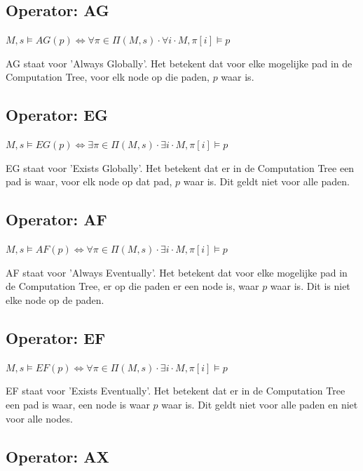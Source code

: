 \documentclass{article}
\begin{document}
		\subsection{Operator: AG}
				
		\( M, s \models AG(p) \iff \forall \pi \in \Pi (M, s) \cdot \forall i \cdot M, \pi [i] \models p\)

		AG staat voor 'Always Globally'. Het betekent dat voor elke mogelijke pad in de Computation Tree, voor elk node op die paden, \( p \) waar is.
		
		\subsection{Operator: EG}
				
		\( M, s \models EG(p) \iff \exists \pi \in \Pi (M, s) \cdot \exists i \cdot M, \pi [i] \models p\)

		EG staat voor 'Exists Globally'. Het betekent dat er in de Computation Tree een pad is waar, voor elk node op dat pad, \( p \) waar is. Dit geldt niet voor alle paden.
		
		\subsection{Operator: AF}
				
		\( M, s \models AF(p) \iff \forall \pi \in \Pi (M, s) \cdot \exists i \cdot M, \pi [i] \models p\)

		AF staat voor 'Always Eventually'. Het betekent dat voor elke mogelijke pad in de Computation Tree, er op die paden er een node is, waar \( p \) waar is. Dit is niet elke node op de paden.
		
		\subsection{Operator: EF}
				
		\( M, s \models EF(p) \iff \forall \pi \in \Pi (M, s) \cdot \exists i \cdot M, \pi [i] \models p\)

		EF staat voor 'Exists Eventually'. Het betekent dat er in de Computation Tree een pad is waar, een node is waar \( p \) waar is. Dit geldt niet voor alle paden en niet voor alle nodes.
		
		\subsection{Operator: AX}
				
\end{document}
